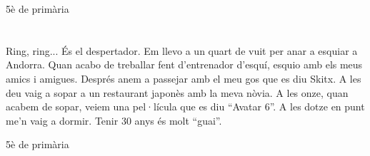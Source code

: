 \begin{news}
							{5è de primària}

\section*{}
Ring, ring... És el despertador. Em llevo a un quart de vuit per anar a esquiar a Andorra. Quan acabo de treballar fent d’entrenador d’esquí, esquio amb els meus amics i amigues. Després anem a passejar amb el meu gos que es diu Skitx. A les deu vaig a sopar a un restaurant japonès amb la meva nòvia. A les onze, quan acabem de sopar,  veiem una pel·lícula que es diu “Avatar 6”. A les dotze en punt me’n vaig a dormir. Tenir 30 anys és molt “guai”.

				{5è de primària}

\end{news}
